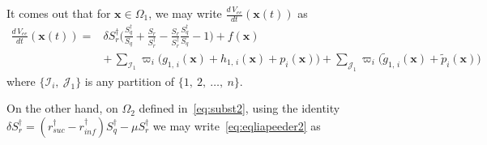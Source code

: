 \documentclass[a4paper]{article}
\newcommand{\dsum}{\displaystyle\sum}
\begin{document}
\noindent It comes out that for $\mathbf x\in\Omega_1$, we may write $\frac{d\,V_{ee}}{dt}(\mathbf x(t))$ as \begin{align}
\frac{d\,V_{ee}}{dt}(\mathbf x(t)) =& \delta S_r^\dagger\Big(\frac{S^\dagger_q}{S_q} + \frac{S_r}{S^\dagger_r} - \frac{S_r}{S^\dagger_r}\frac{S^\dagger_q}{S_q}-1\Big) + f(\mathbf x)\nonumber\\& +\, \dsum_{\mathcal I_1}\varpi_i\Big(g_{1,\,i}(\mathbf x)+h_{1,\,i}(\mathbf x)+p_{i}(\mathbf x)\Big)+ \dsum_{\mathcal J_1}\varpi_i\Big(\widetilde g_{1,\,i}(\mathbf x) + \widetilde p_{i}(\mathbf x)\Big)\label{eq:rdcexp1vee}
\end{align} where $\{\mathcal I_i,~\mathcal J_1\}$ is any partition of $\{1,~2,~\ldots,~n\}$.

\noindent On the other hand, on $\Omega_2$ defined in~\eqref{eq:subst2}, using the identity $\delta S_r^\dagger  = (r_{suc} ^\dagger -r_{inf}^\dagger )S_q^\dagger -\mu S_r^\dagger $ we may write~\eqref{eq:eqliapeeder2} as
\end{document}
